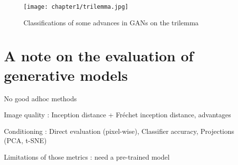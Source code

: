\begin{figure}
	\texttt{[image: chapter1/trilemma.jpg]}
	\caption{Classifications of some advances in GANs on the trilemma}
\end{figure}

\section{A note on the  evaluation of generative models}

No good adhoc methods

Image quality : Inception distance + Fréchet inception distance, advantages

Conditioning : Direct evaluation (pixel-wise), Classifier accuracy, Projections (PCA, t-SNE)

Limitations of those metrics : need a pre-trained model


